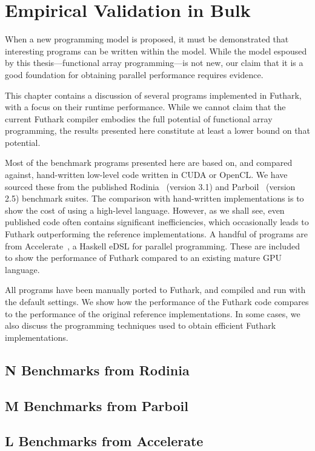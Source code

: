 \chapter{Empirical Validation in Bulk}
\label{chap:empirical-validation}

When a new programming model is proposed, it must be demonstrated that
interesting programs can be written within the model.  While the model
espoused by this thesis---functional array programming---is not new,
our claim that it is a good foundation for obtaining parallel
performance requires evidence.

This chapter contains a discussion of several programs implemented in
Futhark, with a focus on their runtime performance.  While we cannot
claim that the current Futhark compiler embodies the full potential of
functional array programming, the results presented here constitute at
least a lower bound on that potential.

Most of the benchmark programs presented here are based on, and
compared against, hand-written low-level code written in CUDA or
OpenCL.  We have sourced these from the published
Rodinia~\cite{5306797} (version 3.1) and
Parboil~\cite{stratton2012parboil} (version 2.5) benchmark suites.
The comparison with hand-written implementations is to show the cost
of using a high-level language.  However, as we shall see, even
published code often contains significant inefficiencies, which
occasionally leads to Futhark outperforming the reference
implementations.  A handful of programs are from
Accelerate~\cite{mcdonell2013optimising}, a Haskell eDSL for parallel
programming.  These are included to show the performance of Futhark
compared to an existing mature GPU language.

All programs have been manually ported to Futhark, and compiled and
run with the default settings.  We show how the performance of the
Futhark code compares to the performance of the original reference
implementations.  In some cases, we also discuss the programming
techniques used to obtain efficient Futhark implementations.

\section{N Benchmarks from Rodinia}

\section{M Benchmarks from Parboil}

\section{L Benchmarks from Accelerate}

